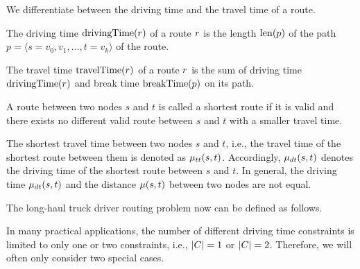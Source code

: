 We differentiate between the driving time and the travel time of a route.

\begin{definition}
	The driving time $\operatorname{drivingTime}(r)$ of a route $r$ is the length $\operatorname{len}(p)$ of the path $p = \langle s=v_0,v_1,...,t=v_k \rangle$ of the route.
\end{definition}

\begin{definition}
	The travel time $\operatorname{travelTime}(r)$ of a route $r$ is the sum of driving time $\operatorname{drivingTime}(r)$ and break time  $\operatorname{breakTime}(p)$ on its path.
\end{definition}

\begin{definition}
	A route between two nodes $s$ and $t$ is called a shortest route if it is valid and there exists no different valid route between $s$ and $t$ with a smaller travel time.
\end{definition}

The shortest travel time between two nodes $s$ and $t$, i.e., the travel time of the shortest route between them is denoted as $\mu_{tt}(s,t)$. Accordingly, $\mu_{dt}(s,t)$ denotes the driving time of the shortest route between $s$ and $t$. In general, the driving time $\mu_{dt}(s,t)$ and the distance $\mu(s,t)$ between two nodes are not equal.

The long-haul truck driver routing problem now can be defined as follows.

\begin{namedproblem}
\end{namedproblem}

In many practical applications, the number of different driving time constraints is limited to only one or two constraints, i.e., $|C| = 1$ or  $|C| = 2$. Therefore, we will often only consider two special cases.